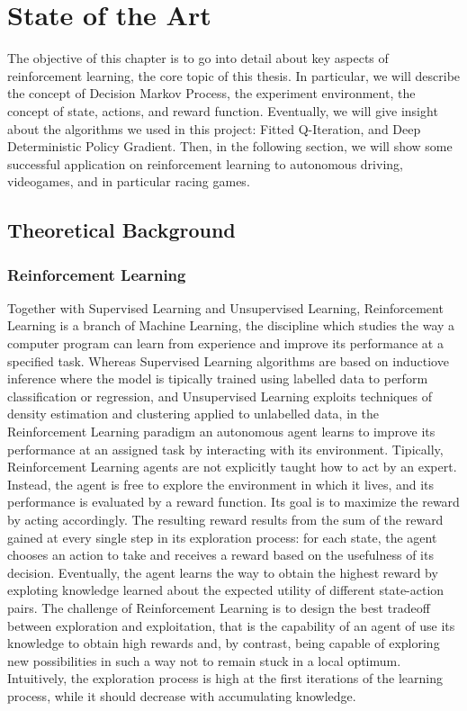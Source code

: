 \chapter{State of the Art}
\label{State of the Art}
\thispagestyle{empty}



The objective of this chapter is to go into detail about key aspects of reinforcement learning, the core topic of this thesis. In particular, we will describe the concept of Decision Markov Process, the experiment environment, the concept of state, actions, and reward function. Eventually, we will give insight about the algorithms we used in this project: Fitted Q-Iteration, and Deep Deterministic Policy Gradient. 
Then, in the following section, we will show some successful application on reinforcement learning to autonomous driving, videogames, and in particular racing games.


\section{Theoretical Background}

\subsection{Reinforcement Learning}
Together with Supervised Learning and Unsupervised Learning, Reinforcement Learning is a branch of Machine Learning, the discipline which studies the way a computer program can learn from experience and improve its performance at a specified task. Whereas Supervised Learning algorithms are based on inductiove inference where the model is tipically trained using labelled data to perform classification or regression, and Unsupervised Learning exploits techniques of density estimation and clustering applied to unlabelled data, in the Reinforcement Learning paradigm an autonomous agent learns to improve its performance at an assigned task by interacting with its environment.
Tipically, Reinforcement Learning agents are not explicitly taught how to act by an expert. Instead, the agent is free to explore the environment in which it lives, and its performance is evaluated by a reward function. Its goal is to maximize the reward by acting accordingly. The resulting reward results from the sum of the reward gained at every single step in its exploration process: for each state, the agent chooses an action to take and receives a reward based on the usefulness of its decision. Eventually, the agent learns the way to obtain the highest reward by exploting knowledge learned about the expected utility of different state-action pairs. The challenge of Reinforcement Learning is to design the best tradeoff between exploration and exploitation, that is the capability of an agent of use its knowledge to obtain high rewards and, by contrast, being capable of exploring new possibilities in such a way not to remain stuck in a local optimum. Intuitively, the exploration process is high at the first iterations of the learning process, while it should decrease with accumulating knowledge.

